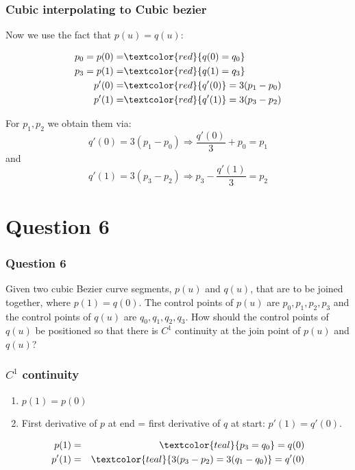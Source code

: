 \documentclass{beamer}
\begin{document}
\begin{frame}
    \frametitle{Cubic interpolating to Cubic bezier}

    Now we use the fact that $p(u) = q(u)$:

    \begin{eqnarray*}
        p_0 = p(0) =& \textcolor{red}{q(0) = q_0}\\
        p_3 = p(1) =& \textcolor{red}{q(1) = q_3}\\
        p'(0) =& \textcolor{red}{q'(0)} = 3(p_1 - p_0)\\
        p'(1) =& \textcolor{red}{q'(1)} = 3(p_3 - p_2)\\
    \end{eqnarray*}

    For $p_1, p_2$ we obtain them via:
    \begin{equation*}
        q'(0) = 3(p_1 - p_0) \Rightarrow \frac{q'(0)}{3} + p_0 = p_1
    \end{equation*}
    and
    \begin{equation*}
        q'(1) = 3(p_3 - p_2) \Rightarrow p_3 - \frac{q'(1)}{3} = p_2
    \end{equation*}
\end{frame}

\section{Question 6}

\begin{frame}
    \frametitle{Question 6}
    Given two cubic Bezier curve segments, $p(u)$ and $q(u)$, that are to be joined together, where $p(1) = q(0)$. 
    The control points of $p(u)$ are $p_0, p_1, p_2, p_3$ and the control points of $q(u)$ are $q_0, q_1, q_2, q_3$. 
    How should the control points of $q(u)$ be positioned so that there is $C^1$ continuity at the join point of $p(u)$ and $q(u)$?
\end{frame}

\begin{frame}
    \frametitle{$C^1$ continuity}

    \begin{enumerate}
        \item $p(1) = p(0)$
        \item First derivative of $p$ at end = first derivative of $q$ at start: $p'(1) = q'(0)$.
    \end{enumerate}
    
    \begin{tcolorbox}
        \begin{eqnarray*}
            p(1) &=& \textcolor{teal}{p_3 = q_0} = q(0) \\
            p'(1) &=& \textcolor{teal}{3(p_3 - p_2) = 3(q_1 - q_0)} = q'(0)
        \end{eqnarray*}
    \end{tcolorbox}

\end{frame}
\end{document}
